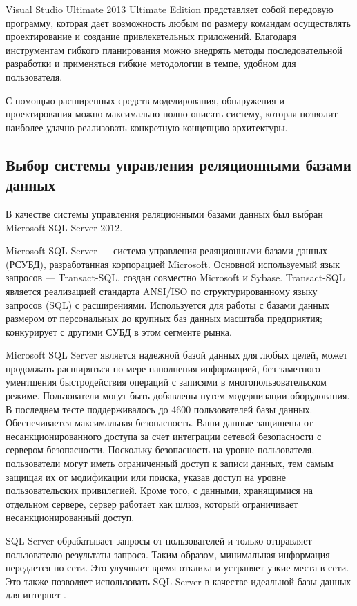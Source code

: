 Visual Studio Ultimate 2013 Ultimate Edition представляет собой передовую программу, которая дает возможность любым по размеру командам осуществлять проектирование и создание привлекательных приложений. Благодаря инструментам гибкого планирования можно внедрять методы последовательной разработки и применяться гибкие методологии в темпе, удобном для пользователя.

С помощью расширенных средств моделирования, обнаружения и проектирования можно максимально полно описать систему, которая позволит наиболее удачно реализовать конкретную концепцию архитектуры.

\subsection{Выбор системы управления реляционными базами данных  }
\label{sub:practice:server}

В качестве системы управления реляционными базами данных был выбран Microsoft SQL Server 2012.   

Microsoft SQL Server — система управления реляционными базами данных (РСУБД), разработанная корпорацией Microsoft. Основной используемый язык запросов — Transact-SQL, создан совместно Microsoft и Sybase. Transact-SQL является реализацией стандарта ANSI/ISO по структурированному языку запросов (SQL) с расширениями. Используется для работы с базами данных размером от персональных до крупных баз данных масштаба предприятия; конкурирует с другими СУБД в этом сегменте рынка.

Microsoft SQL Server является надежной базой данных для любых целей,  может продолжать расширяться по мере  наполнения информацией, без заметного ументшения быстродействия операций с записями в многопользовательском режиме. Пользователи могут быть добавлены путем модернизации оборудования. В последнем тесте поддерживалось до 4600 пользователей базы данных. 
Обеспечивается максимальная безопасность.  Ваши данные защищены от несанкционированного доступа за счет интеграции сетевой безопасности с сервером безопасности.   Поскольку безопасность на уровне пользователя, пользователи могут иметь ограниченный доступ к записи данных, тем самым защищая их от модификации или поиска, указав доступ на уровне пользовательских привилегией.  Кроме того, с данными, хранящимися на отдельном сервере, сервер работает как шлюз, который ограничивает несанкционированный доступ. 

SQL Server обрабатывает запросы от пользователей и только отправляет пользователю результаты запроса.   Таким образом, минимальная информация передается по сети.   Это улучшает время отклика и устраняет узкие места в сети.   Это также позволяет использовать SQL Server в качестве идеальной базы данных для интернет . 

